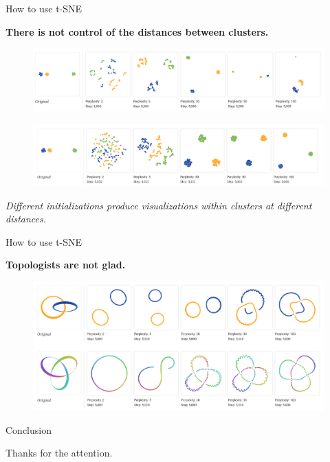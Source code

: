 \documentclass[10pt]{beamer}
\theoremstyle{definition}
\newcommand{\1}{\mathbbm{1}}
\begin{document}
\begin{frame}{How to use t-SNE}
  \begin{center}
    \bf
    There is not control of the distances between clusters.
  \end{center}
  \begin{figure}[h]
    \centering
    \includegraphics[scale=0.2, trim=2cm 0 0 2cm]{./pic/cluster_dist1.png}
  \end{figure}
  \begin{figure}[h]
    \centering
    \includegraphics[scale=0.2, trim=2.3cm 0 0 3cm]{./pic/cluster_dist2.png}
  \end{figure}
  {\it Different initializations produce visualizations within clusters at
  different distances.}
\end{frame}
\begin{frame}{How to use t-SNE}
  \begin{center}
    \bf Topologists are not glad.
  \end{center}
  \begin{figure}[h!]
    \centering
    \includegraphics[scale=0.2, trim = 2cm 0 0 0]{pic/topology.png}
  \end{figure}
\end{frame}
\begin{frame}{Conclusion}{}
    \begin{center}
       \Large
      Thanks for the attention.
    \end{center}
  \end{frame}
\end{document}
